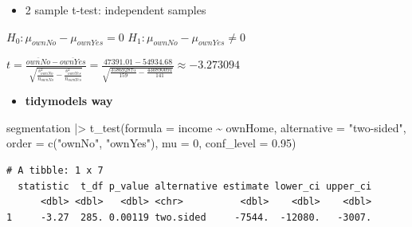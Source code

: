 \documentclass[
  ignorenonframetext,
]{beamer}
\newenvironment{Shaded}{\begin{snugshade}}{\end{snugshade}}
\newcommand{\AttributeTok}[1]{\textcolor[rgb]{0.40,0.45,0.13}{#1}}
\newcommand{\DecValTok}[1]{\textcolor[rgb]{0.68,0.00,0.00}{#1}}
\newcommand{\FloatTok}[1]{\textcolor[rgb]{0.68,0.00,0.00}{#1}}
\newcommand{\FunctionTok}[1]{\textcolor[rgb]{0.28,0.35,0.67}{#1}}
\newcommand{\NormalTok}[1]{\textcolor[rgb]{0.00,0.23,0.31}{#1}}
\newcommand{\SpecialCharTok}[1]{\textcolor[rgb]{0.37,0.37,0.37}{#1}}
\newcommand{\StringTok}[1]{\textcolor[rgb]{0.13,0.47,0.30}{#1}}
\providecommand{\tightlist}{%
  \setlength{\itemsep}{0pt}\setlength{\parskip}{0pt}}\usepackage{longtable,booktabs,array}
\begin{document}
\begin{frame}[fragile]{}
\label{section-21}
\begin{itemize}
\tightlist
\item
  2 sample t-test: independent samples
\end{itemize}

\(H_0: \mu_{ownNo} - \mu_{ownYes}= 0\)
\(H_1: \mu_{ownNo} - \mu_{ownYes} \neq 0\)

\(t = \frac{\overline{ownNo} - \overline{ownYes}}{\sqrt{\frac{s_{ownNo}^2}{n_{ownNo}} - \frac{s_{ownYes}^2}{n_{ownYes}}}} = \frac{47391.01 - 54934.68}{\sqrt{ \frac{358692875}{159} - \frac{430890091}{141}}} \approx -3.273094\)

\begin{itemize}
\tightlist
\item
  \textbf{tidymodels way}
\end{itemize}

\tiny

\begin{Shaded}
\begin{Highlighting}[]
\NormalTok{segmentation }\SpecialCharTok{|\textgreater{}} 
  \FunctionTok{t\_test}\NormalTok{(}\AttributeTok{formula =}\NormalTok{ income }\SpecialCharTok{\textasciitilde{}}\NormalTok{ ownHome,}
         \AttributeTok{alternative =} \StringTok{"two{-}sided"}\NormalTok{,}
         \AttributeTok{order =} \FunctionTok{c}\NormalTok{(}\StringTok{"ownNo"}\NormalTok{, }\StringTok{"ownYes"}\NormalTok{),}
         \AttributeTok{mu =} \DecValTok{0}\NormalTok{,}
         \AttributeTok{conf\_level =} \FloatTok{0.95}\NormalTok{)}
\end{Highlighting}
\end{Shaded}

\begin{verbatim}
# A tibble: 1 x 7
  statistic  t_df p_value alternative estimate lower_ci upper_ci
      <dbl> <dbl>   <dbl> <chr>          <dbl>    <dbl>    <dbl>
1     -3.27  285. 0.00119 two.sided     -7544.  -12080.   -3007.
\end{verbatim}
\end{frame}
\end{document}

